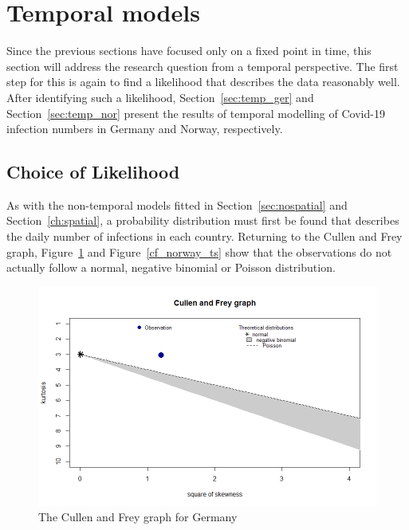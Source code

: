 \section{Temporal models}\label{sec:temporal}
Since the previous sections have focused only on a fixed point in time, this section will address the research question from a temporal perspective. The first step for this is again to find a likelihood that describes the data reasonably well. After identifying such a likelihood, Section~\ref{sec:temp_ger} and Section~\ref{sec:temp_nor} present the results of temporal modelling of Covid-19 infection numbers in Germany and Norway, respectively.
\subsection{Choice of Likelihood}
As with the non-temporal models fitted in Section~\ref{sec:nospatial} and Section~\ref{ch:spatial}, a probability distribution must first be found that describes the daily number of infections in each country. Returning to the Cullen and Frey graph, Figure~\ref{cf_germany_ts} and Figure~\ref{cf_norway_ts} show that the observations do not actually follow a normal, negative binomial or Poisson distribution.
\begin{figure}[H]
  \centering
  \includegraphics[width = \textwidth]{cf_germany_ts.png}
  \caption{The Cullen and Frey graph for Germany}
  \label{cf_germany_ts}
\end{figure}
\clearpage
